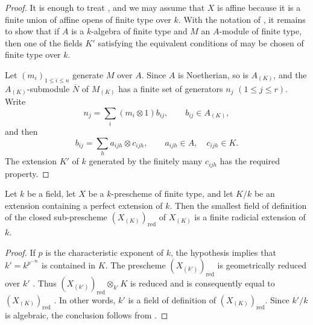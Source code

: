 \begin{proof}
It is enough to treat , and we may assume that $X$ is
affine because it is a finite union of affine opens of finite type
over $k$.
With the notation of , it remains to show that if $A$
is a $k$-algebra of finite type and $M$ an $A$-module of finite type,
then one of the fields $K'$ satisfying the equivalent conditions of
 may be chosen of finite type over $k$.

Let $(m_i)_{1\le i\le n}$ generate $M$ over $A$.
Since $A$ is Noetherian, so is $A_{(K)}$, and the
$A_{(K)}$-submodule $\overline N$ of $M_{(K)}$ has a finite set of
generators $n_j$ $(1\le j\le r)$.
Write
\[
n_j=\sum_i(m_i\otimes1)b_{ij},
\qquad b_{ij}\in A_{(K)},
\]
and then
\[
b_{ij}=\sum_h a_{ijh}\otimes c_{ijh},
\qquad a_{ijh}\in A,\quad c_{ijh}\in K.
\]
The extension $K'$ of $k$ generated by the finitely many
$c_{ijh}$ has the required property.
\end{proof}

\begin{proposition}[4.8.14]
\label{IV.4.8.14}
Let $k$ be a field, let $X$ be a $k$-prescheme of finite type, and
let $K/k$ be an extension containing a perfect extension of $k$.
Then the smallest field of definition of the closed sub-prescheme
$(X_{(K)})_{\mathrm{red}}$ of $X_{(K)}$ is a finite radicial
extension of $k$.
\end{proposition}

\begin{proof}
If $p$ is the characteristic exponent of $k$, the hypothesis implies
that $k'=k^{p^{-\infty}}$ is contained in $K$.
The prescheme $(X_{(k')})_{\mathrm{red}}$ is geometrically reduced
over $k'$ .
Thus $(X_{(k')})_{\mathrm{red}}\otimes_{k'}K$
is reduced and is consequently equal to
$(X_{(K)})_{\mathrm{red}}$ .
In other words, $k'$ is a field of definition of
$(X_{(K)})_{\mathrm{red}}$.
Since $k'/k$ is algebraic, the conclusion follows from
.
\end{proof}

